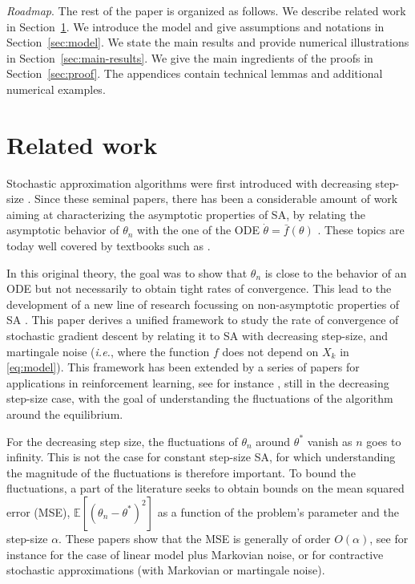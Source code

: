 \documentclass{article}
\newcommand\E{\mathbb{E}}
\newcommand\esp[1]{\E\left[#1\right]}
\newcommand\barf{\bar{f}}
\begin{document}
\emph{Roadmap}. The rest of the paper is organized as follows. We describe related work in Section~\ref{sec:related-work}. We introduce the model and give assumptions and notations in Section~\ref{sec:model}. We state the main results and provide numerical illustrations in Section~\ref{sec:main-results}. We give the main ingredients of the proofs in Section~\ref{sec:proof}. The appendices contain technical lemmas and additional numerical examples.


\section{Related work}
\label{sec:related-work}


Stochastic approximation algorithms were first introduced with decreasing step-size \cite{robbins1951stochastic,blum1954approximation}. Since these seminal papers, there has been a considerable amount of work aiming at characterizing the asymptotic properties of SA, by relating the asymptotic behavior of $\theta_n$ with the one of the ODE $\dot{\theta}=\barf(\theta)$ \cite{benaim2006dynamics,borkar2000ode}. These topics are today well covered by textbooks such as \cite{benveniste2012adaptive,borkar2009stochastic,kushner2003stochastic}. 

In this original theory, the goal was to show that $\theta_n$ is close to the behavior of an ODE but not necessarily to obtain tight rates of convergence.  This lead to the development of a new line of research focussing on non-asymptotic properties of SA \cite{moulines2011non}.  This paper derives a unified framework to study the rate of convergence of stochastic gradient descent by relating it to SA with decreasing step-size, and martingale noise (\emph{i.e.}, where the function $f$ does not depend on $X_k$ in \eqref{eq:model}).  This framework has been extended by a series of papers for applications in reinforcement learning, see for instance \cite{chandak2022concentration,chen2022finite,qu2020finite,mou2021optimal}, still in the decreasing step-size case, with the goal of understanding the fluctuations of the algorithm around the equilibrium.

For the decreasing step size, the fluctuations of $\theta_n$ around $\theta^*$ vanish as $n$ goes to infinity. This is not the case for constant step-size SA, for which understanding the magnitude of the fluctuations is therefore important. To bound the fluctuations, a part of the literature seeks to obtain bounds on the mean squared error (MSE), $\esp{(\theta_n-\theta^*)^2}$ as a function of the problem's parameter and the step-size $\alpha$. These papers show that the MSE is generally of order $O(\alpha)$, see for instance \cite{srikant2019finite} for the case of linear model plus Markovian noise, or \cite{chen2023lyapunov,chen2022finite,chen2023concentration} for contractive stochastic approximations (with Markovian or martingale noise). 
\end{document}
